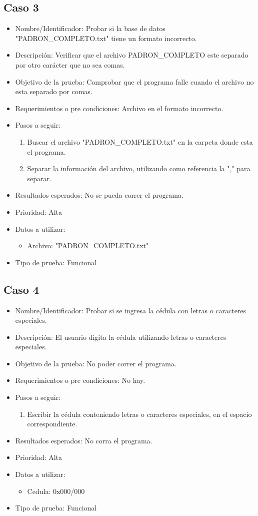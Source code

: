 \documentclass[conference]{IEEEtran}
\begin{document}
\subsection{Caso 3}
\begin{itemize}
\item Nombre/Identificador: Probar si la base de datos "PADRON\_COMPLETO.txt" tiene un formato incorrecto.
\item Descripción: Verificar que el archivo PADRON\_COMPLETO este separado por otro carácter que no sea comas.
\item Objetivo de la prueba: Comprobar que el programa falle cuando el archivo no esta separado por comas. 
\item Requerimientos o pre condiciones: Archivo en el formato incorrecto.
\item Pasos a seguir: 
\begin{enumerate}
\item Buscar el archivo "PADRON\_COMPLETO.txt" en la carpeta donde esta el programa.
\item Separar la información del archivo, utilizando como referencia la "," para separar.
\end{enumerate}
\item Resultados esperados: No se pueda correr el programa.
\item Prioridad: Alta
\item Datos a utilizar: 
\begin{itemize}
\item Archivo: "PADRON\_COMPLETO.txt"
\end{itemize}
\item Tipo de prueba: Funcional
\end{itemize}

\subsection{Caso 4}
\begin{itemize}
\item Nombre/Identificador: Probar si se ingresa la cédula con letras o caracteres especiales.
\item Descripción: El usuario digita la cédula utilizando letras o caracteres especiales.
\item Objetivo de la prueba: No poder correr el programa.
\item Requerimientos o pre condiciones: No hay.
\item Pasos a seguir: 
\begin{enumerate}
\item Escribir la cédula conteniendo letras o caracteres especiales, en el espacio correspondiente.
\end{enumerate}
\item Resultados esperados: No corra el programa.
\item Prioridad: Alta
\item Datos a utilizar: 
\begin{itemize}
\item Cedula: 0x000/000
\end{itemize}
\item Tipo de prueba: Funcional
\end{itemize}
\end{document}
